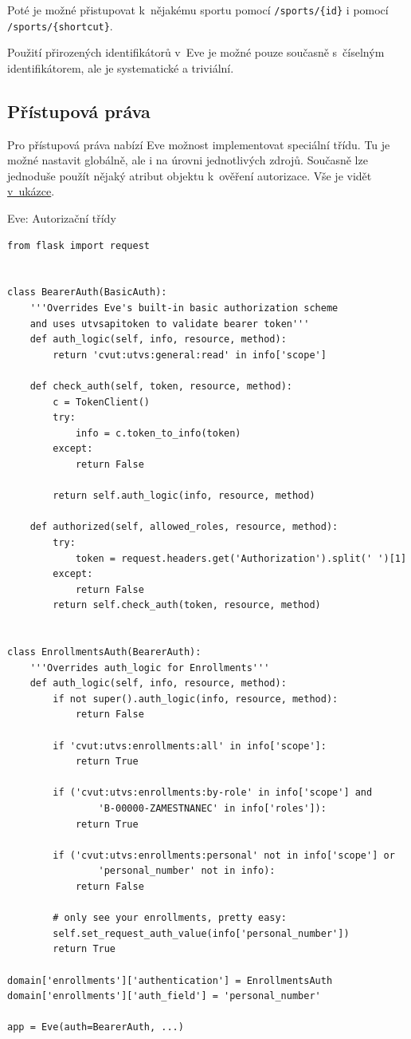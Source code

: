 Poté je možné přistupovat k~nějakému sportu pomocí \verb!/sports/{id}! i pomocí \verb!/sports/{shortcut}!.

Použití přirozených identifikátorů v~Eve je možné pouze současně s~číselným identifikátorem, ale je systematické a triviální.

\subsection{Přístupová práva}\label{pux159uxedstupovuxe1-pruxe1va}

Pro přístupová práva nabízí Eve možnost implementovat speciální třídu. Tu je možné nastavit globálně, ale i na úrovni jednotlivých zdrojů. Současně lze jednoduše použít nějaký atribut objektu k~ověření autorizace. Vše je vidět \protect\hyperlink{code:eve:auth}{v~ukázce}.

\begin{listing}[htbp]
\caption{{\label{code:eve:auth}Eve: Autorizační třídy}}
\begin{verbatim}
from flask import request


class BearerAuth(BasicAuth):
    '''Overrides Eve's built-in basic authorization scheme
    and uses utvsapitoken to validate bearer token'''
    def auth_logic(self, info, resource, method):
        return 'cvut:utvs:general:read' in info['scope']

    def check_auth(self, token, resource, method):
        c = TokenClient()
        try:
            info = c.token_to_info(token)
        except:
            return False

        return self.auth_logic(info, resource, method)

    def authorized(self, allowed_roles, resource, method):
        try:
            token = request.headers.get('Authorization').split(' ')[1]
        except:
            return False
        return self.check_auth(token, resource, method)


class EnrollmentsAuth(BearerAuth):
    '''Overrides auth_logic for Enrollments'''
    def auth_logic(self, info, resource, method):
        if not super().auth_logic(info, resource, method):
            return False

        if 'cvut:utvs:enrollments:all' in info['scope']:
            return True

        if ('cvut:utvs:enrollments:by-role' in info['scope'] and
                'B-00000-ZAMESTNANEC' in info['roles']):
            return True

        if ('cvut:utvs:enrollments:personal' not in info['scope'] or
                'personal_number' not in info):
            return False

        # only see your enrollments, pretty easy:
        self.set_request_auth_value(info['personal_number'])
        return True

domain['enrollments']['authentication'] = EnrollmentsAuth
domain['enrollments']['auth_field'] = 'personal_number'

app = Eve(auth=BearerAuth, ...)
\end{verbatim}
\end{listing}

